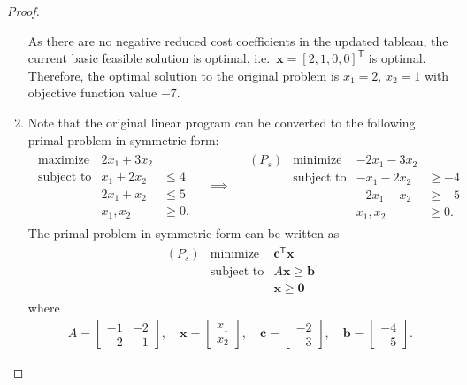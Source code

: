\documentclass[12pt]{article}
\theoremstyle{definition}
\newcommand{\vc}[1]{\boldsymbol{#1}}
\newcommand{\tran}{\mathsf{T}}
\begin{document}
\begin{proof}
\begin{enumerate}
      As there are no negative reduced cost coefficients in the updated tableau, the current basic
      feasible solution is optimal, i.e.\ $\vc{x} = [2, 1, 0, 0]^\tran$ is optimal.
      Therefore, the optimal solution to the original problem is $x_1 = 2$, $x_2 = 1$
      with objective function value $-7$.
    \item Note that the original linear program can be converted to the following primal
      problem in symmetric form:
      \begin{align*}
        \begin{array}{rrl}
          \text{maximize} & 2x_1 + 3x_2 & \\
          \text{subject to} & x_1 + 2x_2 &\leq 4 \\
          & 2x_1 + x_2 &\leq 5 \\
          & x_1, x_2 &\geq 0.
        \end{array}
        \quad
        \implies
        \quad
        \begin{array}{rrrl}
          (P_s) & \text{minimize} & -2x_1 - 3x_2 & \\
          & \text{subject to} & -x_1 - 2x_2 &\geq -4 \\
          & & -2x_1 - x_2 &\geq -5 \\
          & & x_1, x_2 &\geq 0.
        \end{array}
      \end{align*}
      The primal problem in symmetric form can be written as
      \begin{align*}
        \begin{array}{rrl}
          (P_s) & \text{minimize} & \vc{c}^\tran\vc{x}  \\
          & \text{subject to} & A\vc{x}\geq \vc{b}\\
          & & \vc{x} \geq \vc{0}
        \end{array}
      \end{align*}
      where
      \begin{align*}
        A = \begin{bmatrix}-1 & -2 \\ -2 & -1\end{bmatrix},\quad \vc{x} = \begin{bmatrix}x_1 \\ x_2\end{bmatrix}
        ,\quad \vc{c} = \begin{bmatrix}-2 \\ -3\end{bmatrix}        ,\quad \vc{b} = \begin{bmatrix}-4 \\ -5\end{bmatrix}.

\end{align*}
\end{enumerate}
\end{proof}
\end{document}
